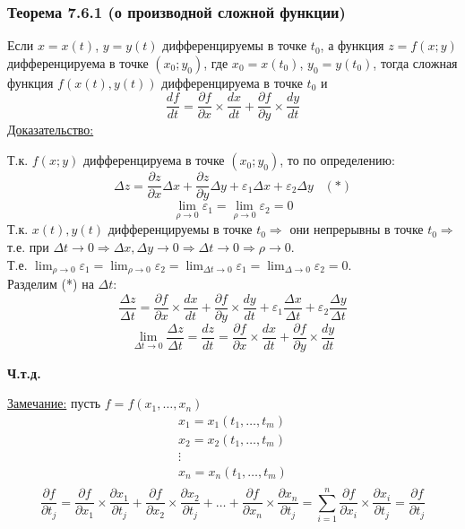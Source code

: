 \documentclass[12pt]{article}
\begin{document}
    \subsubsection*{Теорема 7.6.1 (о производной сложной функции)}\label{th:7.6.1}
    Если $x = x(t)$, $y = y(t)$ дифференцируемы в точке $t_0$, а функция $z = f(x;y)$ дифференцируема в точке $(x_0; y_0)$, где $x_0 = x(t_0)$, $y_0 = y(t_0)$, тогда сложная функция $f(x(t), y(t))$ дифференцируема в точке $t_0$ и 
    \[ \frac{df}{dt} = \frac{\partial f}{\partial x} \times \frac{dx}{dt} + \frac{\partial f}{\partial y} \times \frac{dy}{dt} \]
    \underline{Доказательство:}
    \begin{adjustwidth}{1.5em}{1.5em}
        Т.к. $f(x;y)$ дифференцируема в точке $(x_0; y_0)$, то по определению:
        \[ \Delta z = \frac{\partial z}{\partial x} \Delta x + \frac{\partial z}{\partial y} \Delta y + \varepsilon_1 \Delta x + \varepsilon_2 \Delta y \,\,\,\,\, (*) \]
        \[ \lim_{\rho \to 0} \varepsilon_1 = \lim_{\rho \to 0} \varepsilon_2 = 0 \]
        Т.к. $x(t), y(t)$ дифференцируемы в точке $t_0 \Rightarrow$ они непрерывны в точке $t_0 \Rightarrow$ т.е. при $\Delta t \to 0 \Rightarrow \Delta x, \Delta y \to 0 \Rightarrow \Delta t \to 0 \Rightarrow \rho \to 0$.\\
        Т.е. $\lim_{\rho \to 0} \varepsilon_1 = \lim_{\rho \to 0}\varepsilon_2 = \lim_{\Delta t \to 0} \varepsilon_1 = \lim_{\Delta \to 0}\varepsilon_2 = 0$.\\
        Разделим (*) на $\Delta t$:
        \[ \frac{\Delta z}{\Delta t} = \frac{\partial f}{\partial x} \times \frac{dx}{dt} + \frac{\partial f}{\partial y} \times \frac{dy}{dt} + \varepsilon_1 \frac{\Delta x}{\Delta t} + \varepsilon_2 \frac{\Delta y}{\Delta t} \]
        \[ \lim_{\Delta t \to 0} \frac{\Delta z}{\Delta t} = \frac{dz}{dt} = \frac{\partial f}{\partial x} \times \frac{dx}{dt} + \frac{\partial f}{\partial y} \times \frac{dy}{dt} \]
        \begin{center}
            \textbf{Ч.т.д.}
        \end{center}
    \end{adjustwidth}
    \underline{Замечание:} пусть $f = f(x_1, \dots, x_n)$
    \begin{gather*}
        x_1 = x_1(t_1, \dots, t_m)\\
        x_2 = x_2(t_1, \dots, t_m)\\
        \vdots\\
        x_n = x_n(t_1, \dots, t_m)\\
    \end{gather*}
    \[ \frac{\partial f}{\partial t_j} = \frac{\partial f}{\partial x_1} \times \frac{\partial x_1}{\partial t_j} + \frac{\partial f}{\partial x_2} \times \frac{\partial x_2}{\partial t_j} + \dots + \frac{\partial f}{\partial x_n} \times \frac{\partial x_n}{\partial t_j} = \sum_{i=1}^{n} \frac{\partial f}{\partial x_i} \times \frac{\partial x_i}{\partial t_j} = \frac{\partial f}{\partial t_j} \]
\end{document}
